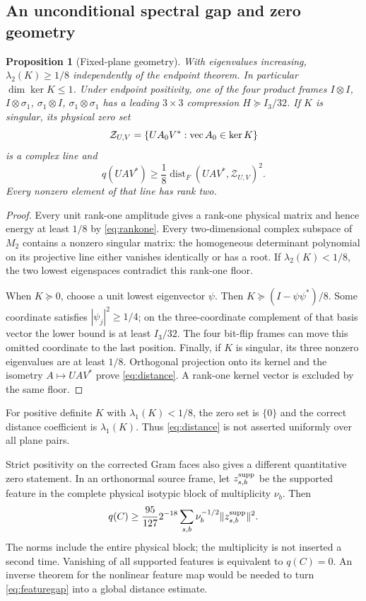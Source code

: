 \documentclass[11pt,a4paper]{article}
\newtheorem{proposition}[theorem]{Proposition}
\theoremstyle{definition}\newtheorem{definition}[theorem]{Definition}
\theoremstyle{remark}\newtheorem{remark}[theorem]{Remark}
\DeclareMathOperator{\dist}{dist}
\numberwithin{equation}{section}
\begin{document}
\subsection{An unconditional spectral gap and zero geometry}
\begin{proposition}[Fixed-plane geometry]\label{prop:geometry}
With eigenvalues increasing, $\lambda_2(K)\ge1/8$ independently
of the endpoint theorem. In particular $\dim\ker K\le1$.
Under endpoint positivity, one of the four product frames
$I\otimes I$, $I\otimes\sigma_1$, $\sigma_1\otimes I$,
$\sigma_1\otimes\sigma_1$ has a leading $3\times3$ compression
$H\succeq I_3/32$.
If $K$ is singular, its physical zero set
\[
\mathcal Z_{U,V}=\{UA_0V^*:\operatorname{vec} A_0\in\ker K\}
\]
is a complex line and
\begin{equation}
q(UAV^*)\ge\frac18\dist_F(UAV^*,\mathcal Z_{U,V})^2.
\label{eq:distance}
\end{equation}
Every nonzero element of that line has rank two.
\end{proposition}
\begin{proof}
Every unit rank-one amplitude gives a rank-one physical matrix and
hence energy at least $1/8$ by \eqref{eq:rankone}.
Every two-dimensional complex subspace of $M_2$ contains a nonzero
singular matrix: the homogeneous determinant polynomial on its
projective line either vanishes identically or has a root.
If $\lambda_2(K)<1/8$, the two lowest eigenspaces contradict this
rank-one floor.

When $K\succeq0$, choose a unit lowest eigenvector $\psi$.
Then $K\succeq(I-\psi\psi^*)/8$.
Some coordinate satisfies $|\psi_j|^2\ge1/4$; on the three-coordinate
complement of that basis vector the lower bound is at least $I_3/32$.
The four bit-flip frames can move this omitted coordinate to the last
position. Finally, if $K$ is singular, its three nonzero eigenvalues
are at least $1/8$. Orthogonal projection onto its kernel and the
isometry $A\mapsto UAV^*$ prove \eqref{eq:distance}. A rank-one kernel
vector is excluded by the same floor.
\end{proof}

For positive definite $K$ with $\lambda_1(K)<1/8$, the zero set is
$\{0\}$ and the correct distance coefficient is $\lambda_1(K)$.
Thus \eqref{eq:distance} is not asserted uniformly over all plane pairs.

Strict positivity on the corrected Gram faces also gives a different
quantitative zero statement. In an orthonormal source frame,
let $z_{s,b}^{\rm supp}$ be the supported feature in the complete
physical isotypic block of multiplicity $\nu_b$. Then
\begin{equation}
q(C)\ge\frac{95}{127}2^{-18}
       \sum_{s,b}\nu_b^{-1/2}\|z_{s,b}^{\rm supp}\|^2.
\label{eq:featuregap}
\end{equation}
The norms include the entire physical block; the multiplicity is not
inserted a second time. Vanishing of all supported features is
equivalent to $q(C)=0$. An inverse theorem for the nonlinear feature
map would be needed to turn \eqref{eq:featuregap} into a global
distance estimate.
\end{document}
